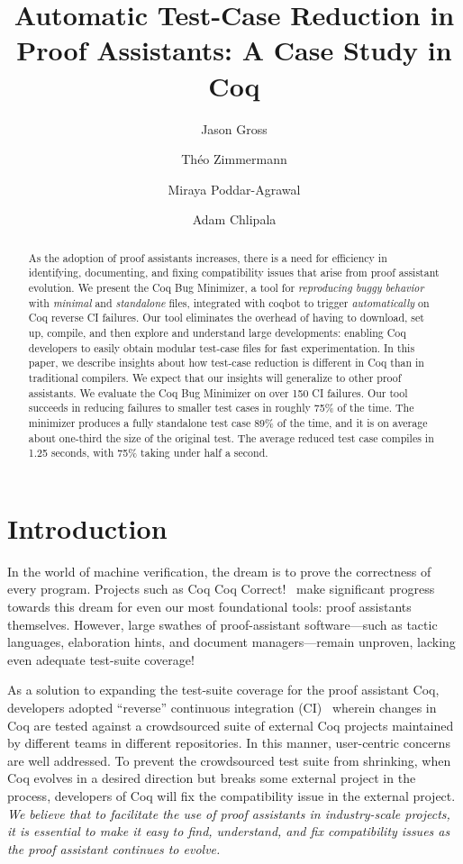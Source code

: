 \documentclass[a4paper,USenglish,cleveref,autoref,thm-restate]{lipics-v2021}
\title{Automatic Test-Case Reduction in Proof Assistants: A Case Study in Coq}
\author{Jason Gross}{CSAIL, Massachusetts Institute of Technology, 77 Massachusetts Ave., Cambridge, MA 02139, USA \and MIRI, USA \and \url{https://jasongross.github.io/} }{jgross@mit.edu}{https://orcid.org/0000-0002-9427-4891}{}%
\author{Théo Zimmermann}{Inria, Université de Paris, CNRS, IRIF, F-75013, Paris, France \and \url{https://www.theozimmermann.net} }{theo@irif.fr}{https://orcid.org/0000-0002-3580-8806}{}
\author{Miraya Poddar-Agrawal}{Reed College, 3203 SE Woodstock Blvd, Portland, OR 97202, USA%
}{ragrawal@reed.edu}{https://orcid.org/0000-0001-7617-9180}{}
\author{Adam Chlipala}{CSAIL, Massachusetts Institute of Technology, 77 Massachusetts Ave., Cambridge, MA 02139, USA \and \url{http://adam.chlipala.net/} }{adamc@csail.mit.edu}{https://orcid.org/0000-0001-7085-9417}{}
\begin{document}
\maketitle

\begin{abstract}
  As the adoption of proof assistants increases, there is a need for efficiency in identifying, documenting, and fixing compatibility issues that arise from proof assistant evolution.
  We present the Coq Bug Minimizer, a tool for \emph{reproducing buggy behavior} with \emph{minimal} and \emph{standalone} files, integrated with coqbot to trigger \emph{automatically} on Coq reverse CI failures.
  Our tool eliminates the overhead of having to download, set up, compile, and then explore and understand large developments: enabling Coq developers to easily obtain modular test-case files for fast experimentation.
  In this paper, we describe insights about how test-case reduction is different in Coq than in traditional compilers.
We expect that our insights will generalize to other proof assistants.
  We evaluate the Coq Bug Minimizer on over 150 CI failures.
  Our tool succeeds in reducing failures to smaller test cases in roughly 75\% of the time.
  The minimizer produces a fully standalone test case 89\% of the time, and it is on average about one-third the size of the original test.
  The average reduced test case compiles in 1.25 seconds, with 75\% taking under half a second.
\end{abstract}

\section{Introduction}

In the world of machine verification, the dream is to prove the correctness of every program.
Projects such as Coq Coq Correct!~\cite{coq-coq-correct} make significant progress towards this dream for even our most foundational tools: proof assistants themselves.
However, large swathes of proof-assistant software—such as tactic languages, elaboration hints, and document managers—remain unproven, lacking even adequate test-suite coverage!

As a solution to expanding the test-suite coverage for the proof assistant Coq, developers adopted ``reverse'' continuous integration (CI)~\cite{zimmermann:tel-02451322,ochoa2022breakbot} wherein changes in Coq are tested against a crowdsourced suite of external Coq projects maintained by different teams in different repositories.
In this manner, user-centric concerns are well addressed.
To prevent the crowdsourced test suite from shrinking, when Coq evolves in a desired direction but breaks some external project in the process, developers of Coq will fix the compatibility issue in the external project.
\emph{We believe that to facilitate the use of proof assistants in industry-scale projects, it is essential to make it easy to find, understand, and fix compatibility issues as the proof assistant continues to evolve.}
\end{document}
